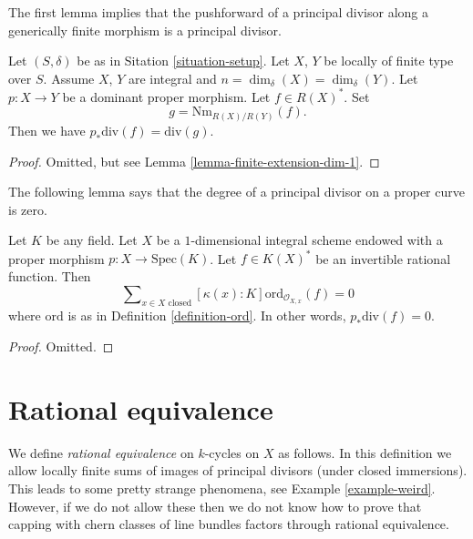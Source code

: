 \noindent
The first lemma implies that the pushforward of a principal
divisor along a generically finite morphism is a principal divisor.

\begin{lemma}
\label{lemma-proper-pushforward-alteration}
Let $(S, \delta)$ be as in Sitation \ref{situation-setup}.
Let $X$, $Y$ be locally of finite type over $S$. Assume $X$, $Y$
are integral and $n = \dim_\delta(X) = \dim_\delta(Y)$.
Let $p : X \to Y$ be a dominant proper morphism.
Let $f \in R(X)^*$. Set
$$
g = \text{Nm}_{R(X)/R(Y)}(f).
$$
Then we have
$p_*\text{div}(f) = \text{div}(g)$.
\end{lemma}

\begin{proof}
Omitted, but see Lemma \ref{lemma-finite-extension-dim-1}.
\end{proof}

\noindent
The following lemma says that the degree of a principal divisor on
a proper curve is zero.

\begin{lemma}
\label{lemma-curve-principal-divisor}
Let $K$ be any field. Let $X$ be a $1$-dimensional integral scheme
endowed with a proper morphism $p : X \to \text{Spec}(K)$.
Let $f \in K(X)^*$ be an invertible rational function.
Then
$$
\sum\nolimits_{x \in X \text{ closed}}
[\kappa(x) : K] \text{ord}_{\mathcal{O}_{X, x}}(f)
=
0
$$
where $\text{ord}$ is as in Definition \ref{definition-ord}.
In other words, $p_*\text{div}(f) = 0$.
\end{lemma}

\begin{proof}
Omitted.
\end{proof}





\section{Rational equivalence}
\label{section-rational-equivalence}

\noindent
We define {\it rational equivalence} on $k$-cycles on $X$ as follows.
In this definition we allow locally finite sums of images of
principal divisors (under closed immersions). This leads to some
pretty strange phenomena, see Example \ref{example-weird}.
However, if we do not allow these then we do not know how to prove that
capping with chern classes of line bundles factors through rational
equivalence.

